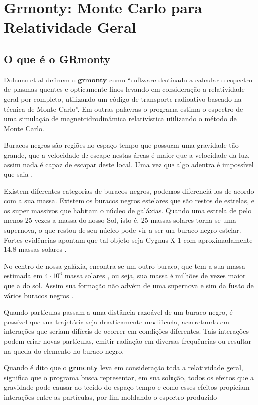 \chapter{Grmonty: Monte Carlo para Relatividade Geral}
\label{cap:grmonty}

\section{O que é o GRmonty}
  Dolence et al definem o \textbf{grmonty} como ``software destinado a calcular o espectro de plasmas quentes e opticamente finos levando em consideração a relatividade geral por completo, utilizando um código de transporte radioativo baseado na técnica de Monte Carlo''\citep[p.1, traduzido]{Dolence:09}. Em outras palavras o programa estima o espectro de uma simulação de magnetoidrodinâmica \cite{eletro-hidro-dynamic:42} relativística utilizando o método de Monte Carlo.

  Buracos negros são regiões no espaço-tempo que possuem uma gravidade tão grande, que a velocidade de escape nestas áreas é maior que a velocidade da luz, assim nada é capaz de escapar deste local. Uma vez que algo adentra é impossível que saia \cite{fatalgravity:10}.

  Existem diferentes categorias de buracos negros, podemos diferenciá-los de acordo com a sua massa. Existem os buracos negros estelares que são restos de estrelas, e os super massivos que habitam o núcleo de galáxias. Quando uma estrela de pelo menos 25 vezes a massa do nosso Sol, isto é, 25 massas solares torna-se uma supernova, o que restou de seu núcleo pode vir a ser um buraco negro estelar. Fortes evidências apontam que tal objeto seja Cygnus X-1 com aproximadamente $14.8$ massas solares \cite{cygx1:11}.

  No centro de nossa galáxia, encontra-se um outro buraco, que tem a sua massa estimada em $4 \cdot 10^6$ massa solares \cite{2016ApJ...830...17B}, ou seja, sua massa é milhões de vezes maior que a do sol. Assim sua formação não advém de uma supernova e sim da fusão de vários buracos negros  \cite{fatalgravity:10}.


  Quando partículas passam a uma distância razoável de um buraco negro, é possível que sua trajetória seja drasticamente modificada, acarretando em interações que seriam difíceis de ocorrer em condições diferentes. Tais interações podem criar novas partículas, emitir radiação em diversas frequências ou resultar na queda do elemento no buraco negro.

  Quando é dito que o \textbf{grmonty} leva em consideração toda a relatividade geral, significa que o programa busca representar, em sua solução, todos os efeitos que a gravidade pode causar ao tecido do espaço-tempo e como esses efeitos propiciam interações entre as partículas, por fim moldando o espectro produzido

